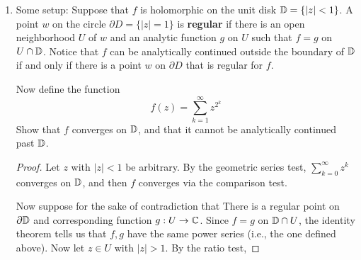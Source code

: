 \documentclass[../psets.tex]{subfiles}
\begin{document}
\begin{enumerate}[label={\textbf{\arabic*.}}]
\begin{enumerate}
\begin{proof}
\begin{equation*}
                f(-ib) = \overline{f(ib)}
            \end{equation*}
            Thus, by transitivity,
            \begin{equation*}
                f(ib) = \overline{f(ib)}
            \end{equation*}
            But for a complex number to equal its complex conjugate, that complex number must be real, as desired.\par
            Now suppose that $f$ is odd. Then
            \begin{equation*}
                f(ib) = -f(-ib)
            \end{equation*}
            We still have in addition that $f(-ib)=\overline{f(ib)}$, so by transitivity,
            \begin{align*}
                f(ib) &= -\overline{f(ib)}\\
                f(ib)+\overline{f(ib)} &= 0\\
                2\re[f(ib)] &= 0\\
                \re[f(ib)] &= 0
            \end{align*}
            Therefore, $f(ib)$ must be purely imaginary, as desired.
        \end{proof}
    \end{enumerate}
    \item Some setup: Suppose that $f$ is holomorphic on the unit disk $\mathbb{D}=\{|z|<1\}$. A point $w$ on the circle $\partial D=\{|z|=1\}$ is \textbf{regular} if there is an open neighborhood $U$ of $w$ and an analytic function $g$ on $U$ such that $f=g$ on $U\cap\mathbb{D}$. Notice that $f$ can be analytically continued outside the boundary of $\mathbb{D}$ if and only if there is a point $w$ on $\partial D$ that is regular for $f$.\par
    Now define the function
    \begin{equation*}
        f(z) = \sum_{k=1}^\infty z^{2^k}
    \end{equation*}
    Show that $f$ converges on $\mathbb{D}$, and that it cannot be analytically continued past $\mathbb{D}$.
    \begin{proof}
        Let $z$ with $|z|<1$ be arbitrary. By the geometric series test, $\sum_{k=0}^\infty z^k$ converges on $\mathbb{D}$, and then $f$ converges via the comparison test.\par
        Now suppose for the sake of contradiction that There is a regular point on $\partial\mathbb{D}$ and corresponding function $g:U\to\mathbb{C}$. Since $f=g$ on $\mathbb{D}\cap U$, the identity theorem tells us that $f,g$ have the same power series (i.e., the one defined above). Now let $z\in U$ with $|z|>1$. By the ratio test,

\end{proof}
\end{enumerate}
\end{document}
